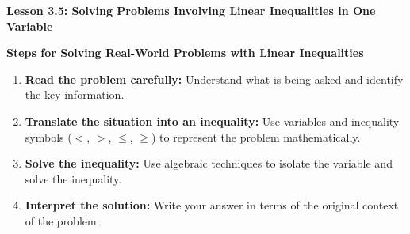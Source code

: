  \begin{center}
\textbf{Lesson 3.5: Solving Problems Involving Linear Inequalities in One Variable}
\end{center}

\vspace*{-1ex}

\noindent\textbf{Steps for Solving Real-World Problems with Linear Inequalities}
\begin{enumerate}[noitemsep, label = \color{blue}\arabic*. ]
    \item \textbf{Read the problem carefully:} Understand what is being asked and identify the key information.
    \item \textbf{Translate the situation into an inequality:} Use variables and inequality symbols ($<$, $>$, $\leq$, $\geq$) to represent the problem mathematically.
    \item \textbf{Solve the inequality:} Use algebraic techniques to isolate the variable and solve the inequality.
    \item \textbf{Interpret the solution:} Write your answer in terms of the original context of the problem.
\end{enumerate}


